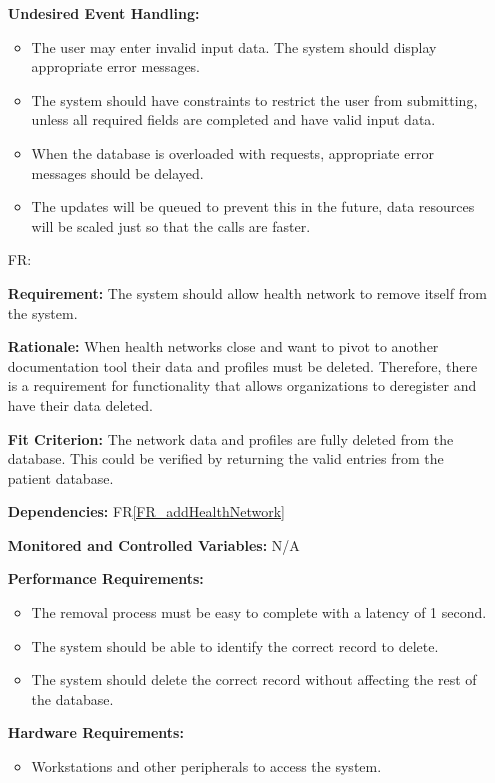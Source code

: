 \documentclass[12pt]{article}
\newcounter{reqnum} %
\begin{document}
\begin{itemize}
\textbf{Undesired Event Handling:} 
\begin{itemize}
  \item The user may enter invalid input data. The system should display appropriate error messages. 
  \item The system should have constraints to restrict the user from submitting, unless all required fields are completed and have valid input data. 
  \item When the database is overloaded with requests, appropriate error messages should be delayed. 
  \item The updates will be queued to prevent this in the future, data resources will be scaled just so that the calls are faster.
\end{itemize}


\item[FR\refstepcounter{reqnum}\thereqnum \label{FR_removeHealthNetwork}:]  

\textbf{Requirement:} The system should allow health network to remove itself from the system.

\textbf{Rationale:} 
When health networks close and want to pivot to another documentation tool their data and profiles must be deleted. Therefore, there is a requirement for functionality that allows organizations to deregister and have their data deleted.

\textbf{Fit Criterion:} 
The network data and profiles are fully deleted from the database. This could be verified by returning the valid entries from the patient database.

\textbf{Dependencies:} FR\ref{FR_addHealthNetwork} 

\textbf{Monitored and Controlled Variables:} N/A

\textbf{Performance Requirements:} 
\begin{itemize}
  \item The removal process must be easy to complete with a latency of 1 second. 
  \item The system should be able to identify the correct record to delete. 
  \item The system should delete the correct record without affecting the rest of the database. 
\end{itemize}

\textbf{Hardware Requirements:} 
\begin{itemize}
  \item Workstations and other peripherals to access the system.
\end{itemize}


\end{itemize}
\end{document}
